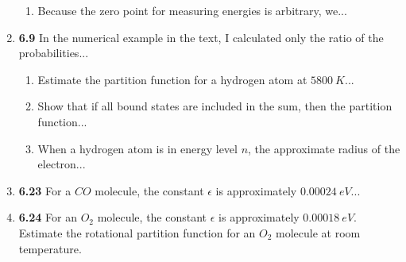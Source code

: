 \documentclass[fleqn]{article}
\begin{document}
\begin{enumerate}
\begin{enumerate}
      \item Because the zero point for measuring energies is arbitrary, we...


    \end{enumerate}

    \item \textbf{6.9} In the numerical example in the text, I calculated only the ratio of the 
    probabilities...
      \begin{enumerate}
        \item Estimate the partition function for a hydrogen atom at $5800 ~ K$...


        \item Show that if all bound states are included in the sum, then the partition function...


        \item When a hydrogen atom is in energy level $n$, the approximate radius of the electron...


      \end{enumerate} 

    \item \textbf{6.23} For a $CO$ molecule, the constant $\epsilon$ is approximately $0.00024 ~ eV$...


    \item \textbf{6.24} For an $O_2$ molecule, the constant $\epsilon$ is approximately $0.00018 ~ eV$. Estimate
    the rotational partition function for an $O_2$ molecule at room temperature.


  \end{enumerate}
\end{document}
